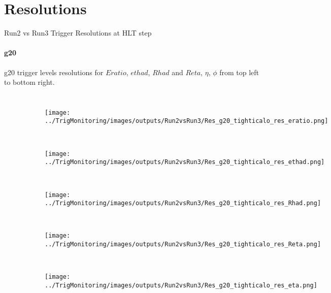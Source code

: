 \documentclass[aspectratio=1610,8pt]{beamer}					%
\begin{document}
\section{Resolutions}
\begin{frame}{Run2 vs Run3 Trigger Resolutions at HLT step}
    \framesubtitle{g20}
    g20 trigger levels resolutions for $Eratio$, $ethad$, $Rhad$ and $Reta$, $\eta$, $\phi$ from top left to bottom right.
    \begin{columns}
    \begin{figure}[h!]
        \centering
        \begin{subfigure}[b]{.3\textwidth}
            \centering
            \texttt{[image: ../TrigMonitoring/images/outputs/Run2vsRun3/Res\_g20\_tighticalo\_res\_eratio.png]}
            \caption{~}
        \end{subfigure}
        \begin{subfigure}[b]{.3\textwidth}
            \centering
            \texttt{[image: ../TrigMonitoring/images/outputs/Run2vsRun3/Res\_g20\_tighticalo\_res\_ethad.png]}
            \caption{~}
        \end{subfigure}
        \begin{subfigure}[b]{.3\textwidth}
            \centering
            \texttt{[image: ../TrigMonitoring/images/outputs/Run2vsRun3/Res\_g20\_tighticalo\_res\_Rhad.png]}
            \caption{~}
        \end{subfigure}
        \begin{subfigure}[b]{.3\textwidth}
            \centering
            \texttt{[image: ../TrigMonitoring/images/outputs/Run2vsRun3/Res\_g20\_tighticalo\_res\_Reta.png]}
            \caption{~}
        \end{subfigure}
        \begin{subfigure}[b]{.3\textwidth}
            \centering
            \texttt{[image: ../TrigMonitoring/images/outputs/Run2vsRun3/Res\_g20\_tighticalo\_res\_eta.png]}

\end{subfigure}
\end{figure}
\end{columns}
\end{frame}
\end{document}
